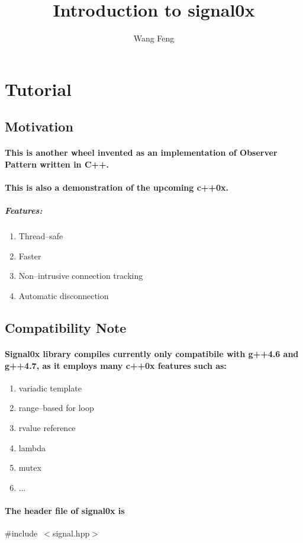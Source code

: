 \documentclass[9pt,onside,a4paper]{article}
\author{Wang Feng}
\title{Introduction to signal0x}
\newcommand{\hlstd}[1]{\textcolor[rgb]{0.2,0,0.4}{#1}}
\newcommand{\hlppc}[1]{\textcolor[rgb]{0.33,0.45,0.69}{#1}}
\begin{document}
\maketitle

\section{Tutorial}
\subsection{Motivation}

\paragraph{This is another wheel invented as an implementation of Observer Pattern written in C++.}
\paragraph{This is also a demonstration of the upcoming c++0x.}
\subparagraph{Features:}
\begin{enumerate}
    \item Thread--safe
    \item Faster
    \item Non--intrusive connection tracking 
    \item Automatic disconnection
\end{enumerate}

\subsection{Compatibility Note}

\paragraph{Signal0x library compiles currently only compatibile with g++4.6 and g++4.7, as it employs many c++0x features such as:}
\begin{enumerate}
\item variadic template
\item range--based for loop
\item rvalue reference
\item lambda
\item mutex
\item ...
\end{enumerate}


\paragraph{The header file of signal0x is\\}
\hlstd{}\hlppc{\#include\ $<$signal.hpp$>$}\hspace*{\fill}
\end{document}
